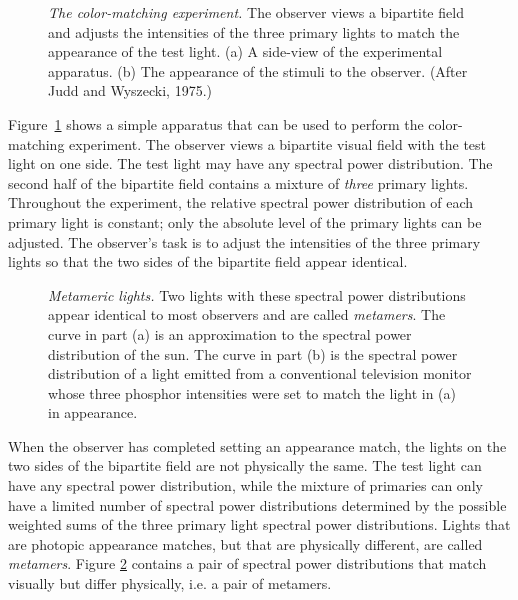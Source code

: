 \begin{figure}
\centerline {
}
\caption[Color Matching Experiment] {
{\em The color-matching experiment.}
The observer views a bipartite field and
adjusts the intensities of the three primary lights to match
the appearance of the test light.
(a)  A side-view of the experimental apparatus.
(b)  The appearance of the stimuli to the observer.
(After Judd and Wyszecki, 1975.)
}
\label{f3:colormatch}
\end{figure}
Figure~\ref{f3:colormatch} shows a simple apparatus that can be
used to perform the color-matching experiment.
The observer views a bipartite visual field
with the test light on one side.
The test light may have any spectral power distribution.
The second half of the bipartite field 
contains a mixture of {\em three}
primary lights.
Throughout the experiment, the relative spectral
power distribution of each primary light is constant;
only the absolute level of the primary lights
can be adjusted.
The observer's task is to adjust
the intensities of the three primary lights
so that the two sides of the
bipartite field appear identical.

\begin{figure}
\centerline {
}
\caption[Monitor Metamers]{
{\em Metameric lights.}
Two lights with these spectral power distributions
appear identical to most observers and are called {\em metamers}.
The curve in part (a) is an approximation
to the spectral power distribution of the sun.
The curve in part (b)
is the spectral power distribution of 
a light emitted from a conventional television monitor
whose three phosphor intensities were
set to match the light in (a) in appearance.
}
\label{f3:metamers}
\end{figure}
When the observer has completed setting an appearance match,
the lights on the two sides of the bipartite field are not
physically the same.
The test light can have any spectral power distribution,
while the mixture of primaries can only have a limited
number of spectral power distributions determined by the
possible weighted sums of the three primary light spectral
power distributions.
Lights that are photopic appearance matches, but
that are physically different, are called {\em metamers}.
Figure \ref{f3:metamers}
contains a pair of spectral power distributions
that match visually but differ physically, i.e.
a pair of metamers.

